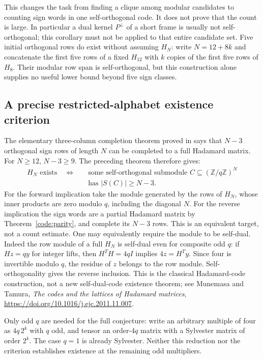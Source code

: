 \documentclass[11pt]{article}
\begin{document}
This changes the task from finding a clique among modular candidates
to counting sign words in one self-orthogonal code. It does not prove
that the count is large. In particular a dual kernel $P^\perp$ of a
short frame is usually not self-orthogonal; this corollary must not
be applied to that entire candidate set.
Five initial orthogonal rows do exist without assuming $H_N$:
write $N=12+8k$ and concatenate the first five rows of a fixed
$H_{12}$ with $k$ copies of the first five rows of $H_8$.
Their modular row span is self-orthogonal, but this construction
alone supplies no useful lower bound beyond five sign classes.

\subsection{A precise restricted-alphabet existence criterion}
The elementary three-column completion theorem proved in
 says that $N-3$ orthogonal
sign rows of length $N$ can be completed to a full Hadamard matrix.
For $N\ge12$, $N-3\ge9$. The preceding theorem therefore gives:
\[
 \begin{split}
 H_N\text{ exists}\quad\Longleftrightarrow\quad&
 \text{some self-orthogonal submodule }C\subseteq
 (\mathbb Z/q\mathbb Z)^N\\[-2pt]
 &\text{has }|S(C)|\ge N-3.
 \end{split}
\]
For the forward implication take the module generated by the rows
of $H_N$, whose inner products are zero modulo $q$, including the
diagonal $N$. For the reverse implication the sign words are a
partial Hadamard matrix by Theorem~\ref{code:parity}, and complete
its $N-3$ rows. This is an equivalent target, not a count estimate.
One may equivalently require the module to be self-dual. Indeed the
row module of a full $H_N$ is self-dual even for composite odd $q$:
if $Hz=qy$ for integer lifts, then $H^TH=4qI$ implies
$4z=H^Ty$. Since four is invertible modulo $q$, the residue of
$z$ belongs to the row module. Self-orthogonality gives the reverse
inclusion. This is the classical Hadamard-code construction, not
a new self-dual-code existence theorem; see Munemasa and Tamura,
\emph{The codes and the lattices of Hadamard matrices},
\url{https://doi.org/10.1016/j.ejc.2011.11.007}.

Only odd $q$ are needed for the full conjecture: write an arbitrary
multiple of four as $4q\,2^k$ with $q$ odd, and tensor an order-$4q$
matrix with a Sylvester matrix of order $2^k$. The case $q=1$
is already Sylvester. Neither this reduction nor the criterion
establishes existence at the remaining odd multipliers.
\end{document}
